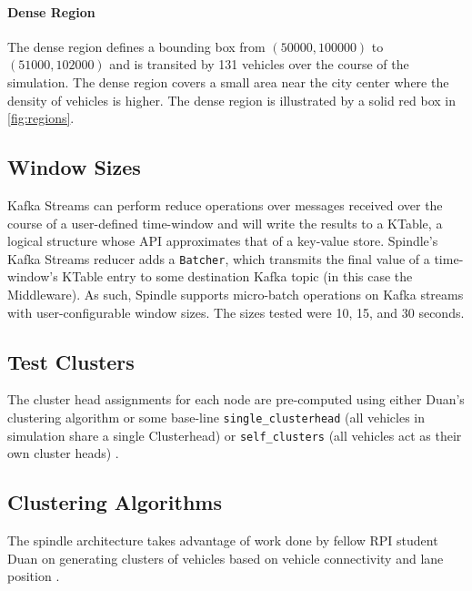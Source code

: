 \documentclass{thesis}
\begin{document}
    \paragraph{Dense Region}
        The dense region defines a bounding box from $(50000, 100000)$ to $(51000, 102000)$ and is transited by
        131 vehicles over the course of the simulation. The dense region covers a small area near the city center
        where the density of vehicles is higher. The dense region is illustrated by a solid red box in \ref{fig:regions}.

\subsection{Window Sizes}
    Kafka Streams can perform reduce operations over messages received over the course of a user-defined time-window
    and will write the results to a KTable, a logical structure whose API approximates that of a key-value store. %
    Spindle's Kafka Streams reducer adds a \verb|Batcher|, which transmits the final value of a time-window's KTable
    entry to some destination Kafka topic (in this case the Middleware). As such, Spindle supports micro-batch operations
    on Kafka streams with user-configurable window sizes. The sizes tested were 10, 15, and 30 seconds.
\subsection{Test Clusters}
    The cluster head assignments for each node are pre-computed using either Duan's
    clustering algorithm or some base-line \verb|single_clusterhead| (all vehicles in simulation share a single Clusterhead)
    or \verb|self_clusters| (all vehicles act as their own cluster heads) \cite{xiaotian}.
\subsection{Clustering Algorithms}
    The spindle architecture takes advantage of work done by fellow RPI student Duan on generating
    clusters of vehicles based on vehicle connectivity and lane position \cite{xiaotian}. 
\end{document}
